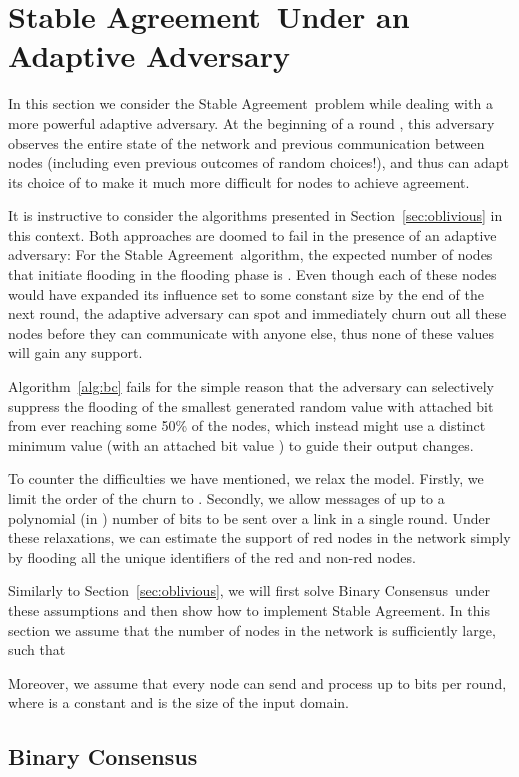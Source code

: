 \documentclass[leqno,11pt]{article}
\newcommand{\sa}{{\sc Stable Agreement}}
\newcommand{\bc}{{\sc Binary Consensus}}
\newcommand{\onlyLong}[1]{\ifthenelse{\boolean{short}}{}{#1}}
\begin{document}
\section{\sa\ Under an Adaptive Adversary} \label{sec:adaptive}

In this section we consider the \sa\ problem while dealing with a more
powerful adaptive adversary. At the beginning of a round , this adversary
observes the entire state of the network and previous communication between
nodes (including even previous outcomes of random choices!), and thus can adapt
its choice of  to make it much more difficult for nodes to achieve
agreement. 


It is instructive to consider the algorithms  presented in
Section~\ref{sec:oblivious} in this context.  Both approaches are doomed to fail
in the presence of an adaptive adversary: For the \sa\ algorithm, the expected
number of nodes that initiate flooding in the flooding phase is . Even
though each of these nodes would have expanded its influence set to
some constant size by the end of the next round, the adaptive adversary can spot
and immediately churn out all these nodes before they can communicate with
anyone else, thus none of these values will gain any support. 


Algorithm~\ref{alg:bc} fails for the simple reason that the adversary can
selectively suppress the flooding of the smallest generated random value
 with attached bit  from ever reaching some 50\% of the
nodes, which instead might use a distinct minimum value  (with an attached
bit value ) to guide their output
changes.  


To counter the difficulties we have mentioned, we relax the model. Firstly, we
limit the order of the churn to . Secondly, we  allow messages of up
to a polynomial (in ) number of bits to be sent over a link in a single round. 
Under these relaxations, we can estimate the support of red nodes in the network
simply by flooding all the unique identifiers of the red and non-red
nodes\onlyLong{ (cf.\ Theorem~\ref{thm:AdaptiveSupport})}.

Similarly to Section~\ref{sec:oblivious}, we will first solve \bc\ under these
assumptions and then show how to implement \sa. In this section we assume that
the number of nodes in the network is sufficiently large, such that

Moreover, we assume that every node can send and process up to 
bits per round, where  is a constant and  is the size of the input domain.
\subsection{\bc} \label{sec:adaptiveBC}
\end{document}
